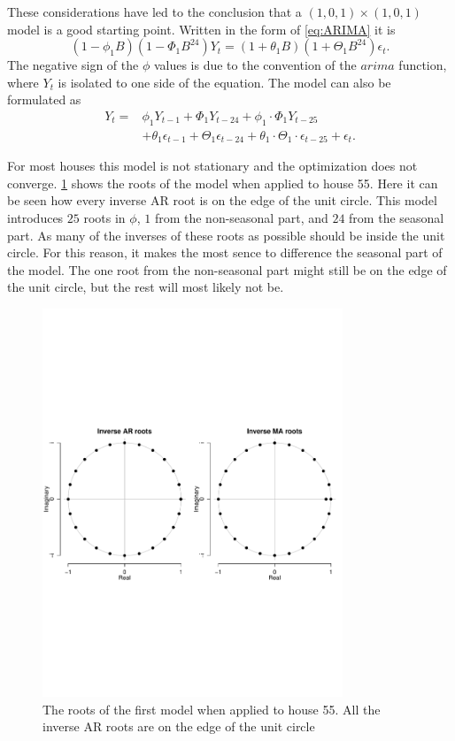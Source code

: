 \noindent These considerations have led to the conclusion that a $(1,0,1)\times (1,0,1)$ model is a good starting point. Written in the form of \cref{eq:ARIMA} it is
\begin{equation}
    (1-\phi_1 B)(1-\Phi_1 B^{24})Y_t = (1+\theta_1 B)(1+\Theta_1 B^{24}) \epsilon_t. \label{eq:model1}
\end{equation}
The negative sign of the $\phi$ values is due to the convention of the $arima$ function, where $Y_t$ is isolated to one side of the equation. The model can also be formulated as
\begin{align}
    Y_t = &\phi_1 Y_{t-1} + \Phi_1 Y_{t-24} + \phi_1 \cdot \Phi_1  Y_{t-25}\\  &+ \theta_1 \epsilon_{t-1} + \Theta_1 \epsilon_{t-24} + \theta_1 \cdot \Theta_1 \cdot \epsilon_{t-25} + \epsilon_t. \nonumber
\end{align}

For most houses this model is not stationary and the optimization does not converge. \cref{fig:Model1_stationarity} shows the roots of the model when applied to house 55. Here it can be seen how every inverse AR root is on the edge of the unit circle. This model introduces $25$ roots in $\phi$, $1$ from the non-seasonal part, and $24$ from the seasonal part. As many of the inverses of these roots as possible should be inside the unit circle. For this reason, it makes the most sence to difference the seasonal part of the model. The one root from the non-seasonal part might still be on the edge of the unit circle, but the rest will most likely not be.

\begin{figure}
    \centering
    \includegraphics[width=0.8\textwidth]{../../../figures/arimax/Stationarity_model1.pdf}
    \caption{The roots of the first model when applied to house 55. All the inverse AR roots are on the edge of the unit circle}
    \label{fig:Model1_stationarity}
\end{figure}

